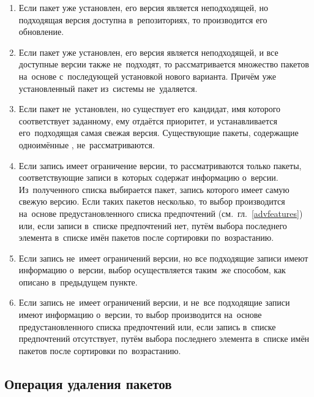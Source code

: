 \begin{enumerate}

\item {
Если пакет уже установлен, его версия является неподходящей,
но подходящая версия доступна в~репозиториях, то производится его обновление.
}

\item {
Если пакет уже установлен, его версия является неподходящей, и все доступные версии также не~подходят,
то рассматривается множество пакетов на~основе  с~последующей установкой нового варианта.
Причём уже установленный пакет из~системы не~удаляется.
}

\item{
Если пакет не~установлен, но существует его~кандидат, имя которого соответствует заданному, ему отдаётся приоритет, и
 устанавливается  его~подходящая самая свежая версия.
Существующие пакеты, содержащие одноимённые , не~рассматриваются.
}

\item {
Если запись  имеет ограничение версии, то рассматриваются только пакеты,
соответствующие записи  в~которых содержат информацию о~версии.
Из~полученного списка выбирается пакет, запись  которого имеет самую свежую версию.
Если таких пакетов несколько, то выбор производится на~основе предустановленного списка предпочтений (см.~гл.~\ref{advfeatures})
или, если записи в~списке предпочтений нет, 
путём выбора последнего элемента в~списке имён пакетов после сортировки по~возрастанию.
}

\item {
Если запись  не~имеет ограничений версии, но все подходящие записи  имеют информацию о~версии,
выбор осуществляется таким~же способом, как описано в~предыдущем пункте.
}

\item {
Если запись  не~имеет ограничений версии, и не~все подходящие записи  имеют информацию о~версии,
то выбор производится на~основе предустановленного списка предпочтений или, 
если запись в~списке предпочтений отсутствует, путём выбора последнего элемента в~списке имён пакетов после сортировки по~возрастанию.
}

\end{enumerate}

\subsection{Операция удаления пакетов}

